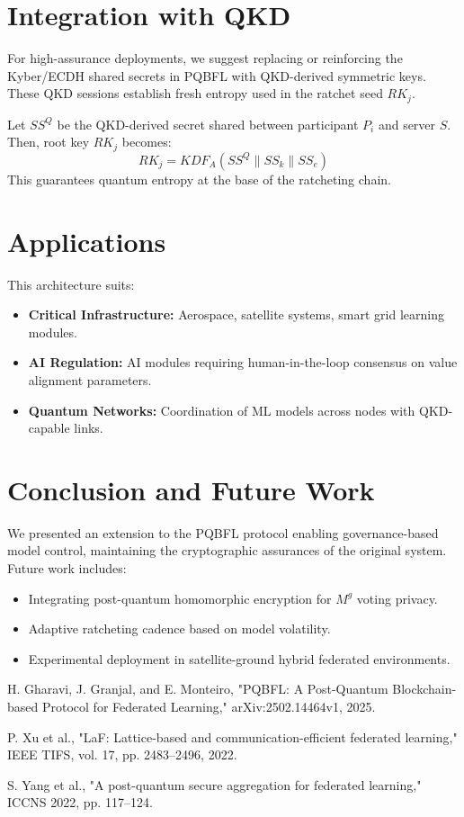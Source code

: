 \documentclass[11pt]{article}
\begin{document}
	\section{Integration with QKD}
	For high-assurance deployments, we suggest replacing or reinforcing the Kyber/ECDH shared secrets in PQBFL with QKD-derived symmetric keys. These QKD sessions establish fresh entropy used in the ratchet seed $RK_j$.
	
	Let $SS^Q$ be the QKD-derived secret shared between participant $P_i$ and server $S$. Then, root key $RK_j$ becomes:
	\[
	RK_j = KDF_{A}(SS^Q \| SS_k \| SS_e)
	\]
	This guarantees quantum entropy at the base of the ratcheting chain.
	
	\section{Applications}
	This architecture suits:
	\begin{itemize}[nosep]
		\item \textbf{Critical Infrastructure:} Aerospace, satellite systems, smart grid learning modules.
		\item \textbf{AI Regulation:} AI modules requiring human-in-the-loop consensus on value alignment parameters.
		\item \textbf{Quantum Networks:} Coordination of ML models across nodes with QKD-capable links.
	\end{itemize}
	
	\section{Conclusion and Future Work}
	We presented an extension to the PQBFL protocol enabling governance-based model control, maintaining the cryptographic assurances of the original system. Future work includes:
	\begin{itemize}[nosep]
		\item Integrating post-quantum homomorphic encryption for $M^g$ voting privacy.
		\item Adaptive ratcheting cadence based on model volatility.
		\item Experimental deployment in satellite-ground hybrid federated environments.
	\end{itemize}
	
	
	\begin{thebibliography}{9}
		H. Gharavi, J. Granjal, and E. Monteiro, "PQBFL: A Post-Quantum Blockchain-based Protocol for Federated Learning," arXiv:2502.14464v1, 2025.
		
		P. Xu et al., "LaF: Lattice-based and communication-efficient federated learning," IEEE TIFS, vol. 17, pp. 2483–2496, 2022.
		
		S. Yang et al., "A post-quantum secure aggregation for federated learning," ICCNS 2022, pp. 117–124.
	\end{thebibliography}
	
\end{document}
